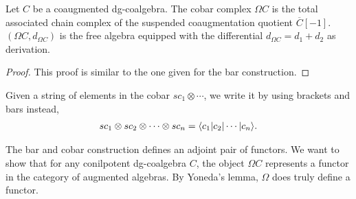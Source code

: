\documentclass[../thesis.tex]{subfiles}
\begin{document}
            \begin{center}
            \end{center}

            \begin{proposition}
                Let $C$ be a coaugmented dg-coalgebra. The cobar complex $\Omega C$ is the total associated chain complex of the suspended coaugmentation quotient $\overline{C}[-1]$. $(\Omega C, d_{\Omega C})$ is the free algebra equipped with the differential $d_{\Omega C} = d_1 + d_2$ as derivation.
            \end{proposition}

            \begin{proof}
                This proof is similar to the one given for the bar construction.
            \end{proof}

            Given a string of elements in the cobar $sc_1 \otimes \cdots$, we write it by using brackets and bars instead,
            \begin{align*}
                sc_1 \otimes sc_2 \otimes \cdots \otimes sc_n = \langle c_1 | c_2 | \cdots | c_n \rangle\tt{.}
            \end{align*}

            The bar and cobar construction defines an adjoint pair of functors. We want to show that for any conilpotent dg-coalgebra $C$, the object $\Omega C$ represents a functor in the category of augmented algebras. By Yoneda's lemma, $\Omega$ does truly define a functor.
\end{document}
